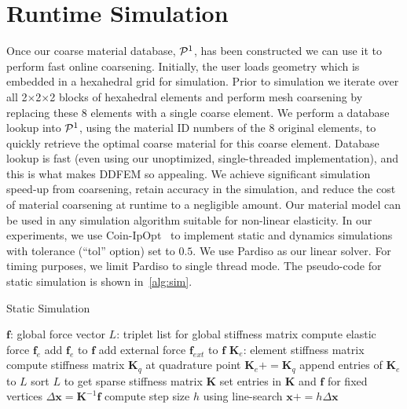 \section{Runtime Simulation}
\label{sec:runtime}
Once our coarse material database, $\mathcal{P}^1$, has been constructed we can use it to perform fast online coarsening. 
Initially, the user loads geometry which is embedded in a hexahedral grid for simulation. Prior to simulation we iterate over all 2$\times$2$\times$2 blocks of hexahedral elements and perform mesh coarsening by replacing these 8 elements with a single coarse element. We perform a database lookup into $\mathcal{P}^1$, using the material ID numbers of the 8 original elements, to quickly retrieve the optimal coarse material for this coarse element. Database lookup is fast (even using our unoptimized, single-threaded implementation), and this is what makes DDFEM so appealing.
We achieve significant simulation speed-up from coarsening, retain accuracy in the simulation, and reduce the cost of material coarsening at runtime to a negligible amount.
	Our material model can be used in any simulation algorithm suitable for non-linear elasticity. In our experiments, we use Coin-IpOpt~\cite{ipopt} to implement static and dynamics simulations with tolerance (``tol'' option) set to $0.5$. We use Pardiso as our linear solver.
	For timing purposes, we limit Pardiso to single thread mode.
	The pseudo-code for static simulation is shown in~\autoref{alg:sim}.
\begin{algorithm}
	\caption{Static Simulation}\label{alg:sim}
	\begin{algorithmic}[1]
		\REPEAT
		\STATE $\mathbf{f}$: global force vector
		\STATE $L$: triplet list for global stiffness matrix
		\STATE compute elastic force $\mathbf{f}_e$
		\STATE add $\mathbf{f}_e$ to $\mathbf{f}$
		\ENDFOR
		\STATE add external force $\mathbf{f}_{ext}$ to $\mathbf{f}$
		\STATE $\mathbf{K}_e$: element stiffness matrix
		\STATE compute stiffness matrix $\mathbf{K}_q$ at quadrature point
		\STATE $\mathbf{K}_e+=\mathbf{K}_q$
		\ENDFOR
		\STATE append entries of $\mathbf{K}_e$ to $L$
		\ENDFOR
		\STATE sort $L$ to get sparse stiffness matrix $\mathbf{K}$
		\STATE set entries in $\mathbf{K}$ and $\mathbf{f}$ for fixed vertices
		\STATE $\Delta\mathbf{x}=\mathbf{K}^{-1}\mathbf{f}$
		\STATE compute step size $h$ using line-search
		\STATE $\mathbf{x}+=h\Delta\mathbf{x}$
	\end{algorithmic}
\end{algorithm}

